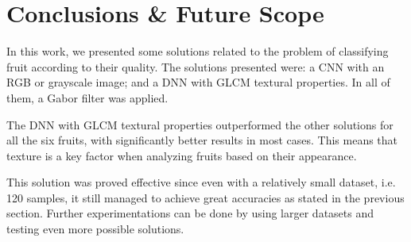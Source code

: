 \documentclass[../main.tex]{subfile}
\begin{document}
\section{Conclusions \& Future Scope} \label{sec:conclusions-&-future-scope}

In this work, we presented some solutions related to the problem of classifying fruit according to their quality. The solutions presented were: a CNN with an RGB or grayscale image; and a DNN with GLCM textural properties. In all of them, a Gabor filter was applied.

The DNN with GLCM textural properties outperformed the other solutions for all the six fruits, with significantly better results in most cases. This means that texture is a key factor when analyzing fruits based on their appearance.

This solution was proved effective since even with a relatively small dataset, i.e. 120 samples, it still managed to achieve great accuracies as stated in the previous section. Further experimentations can be done by using larger datasets and testing even more possible solutions.
\end{document}
